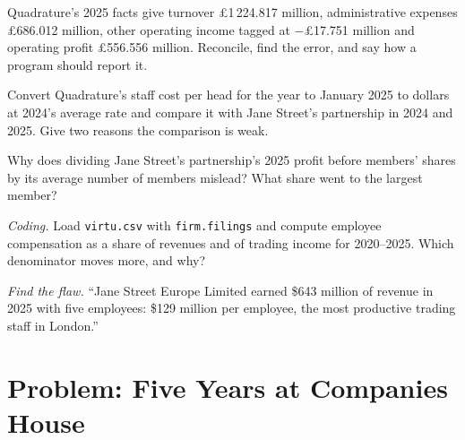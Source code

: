 \begin{exercise}[$\star\star$]\label{exo:in:reading-a-trading-firms-accounts:4}
Quadrature's 2025 facts give turnover \pounds1\,224.817 million, administrative expenses \pounds686.012 million, other
operating income tagged at $-$\pounds17.751 million and operating profit \pounds556.556 million. Reconcile, find the
error, and say how a program should report it.
\end{exercise}

\begin{exercise}[$\star\star$]\label{exo:in:reading-a-trading-firms-accounts:5}
Convert Quadrature's staff cost per head for the year to January 2025 to dollars at 2024's average rate and compare it
with Jane Street's partnership in 2024 and 2025. Give two reasons the comparison is weak.
\end{exercise}

\begin{exercise}[$\star\star$]\label{exo:in:reading-a-trading-firms-accounts:6}
Why does dividing Jane Street's partnership's 2025 profit before members' shares by its average number of members
mislead? What share went to the largest member?
\end{exercise}

\begin{exercise}[$\star\star\star$]\label{exo:in:reading-a-trading-firms-accounts:7}
\emph{Coding.} Load \texttt{virtu.csv} with \texttt{firm.filings} and compute employee compensation as a share of
revenues and of trading income for 2020--2025. Which denominator moves more, and why?
\end{exercise}

\begin{exercise}[$\star\star\star$]\label{exo:in:reading-a-trading-firms-accounts:8}
\emph{Find the flaw.} ``Jane Street Europe Limited earned \$643 million of revenue in 2025 with five employees: \$129
million per employee, the most productive trading staff in London.''
\end{exercise}

\section{Problem: Five Years at Companies House}

